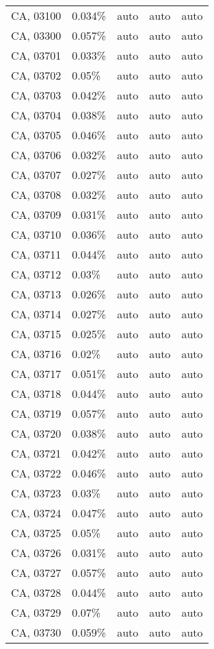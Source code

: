 \begin{longtable}[]{@{}lllll@{}}
CA, 03100 & 0.034\% & auto & auto & auto \\
CA, 03300 & 0.057\% & auto & auto & auto \\
CA, 03701 & 0.033\% & auto & auto & auto \\
CA, 03702 & 0.05\% & auto & auto & auto \\
CA, 03703 & 0.042\% & auto & auto & auto \\
CA, 03704 & 0.038\% & auto & auto & auto \\
CA, 03705 & 0.046\% & auto & auto & auto \\
CA, 03706 & 0.032\% & auto & auto & auto \\
CA, 03707 & 0.027\% & auto & auto & auto \\
CA, 03708 & 0.032\% & auto & auto & auto \\
CA, 03709 & 0.031\% & auto & auto & auto \\
CA, 03710 & 0.036\% & auto & auto & auto \\
CA, 03711 & 0.044\% & auto & auto & auto \\
CA, 03712 & 0.03\% & auto & auto & auto \\
CA, 03713 & 0.026\% & auto & auto & auto \\
CA, 03714 & 0.027\% & auto & auto & auto \\
CA, 03715 & 0.025\% & auto & auto & auto \\
CA, 03716 & 0.02\% & auto & auto & auto \\
CA, 03717 & 0.051\% & auto & auto & auto \\
CA, 03718 & 0.044\% & auto & auto & auto \\
CA, 03719 & 0.057\% & auto & auto & auto \\
CA, 03720 & 0.038\% & auto & auto & auto \\
CA, 03721 & 0.042\% & auto & auto & auto \\
CA, 03722 & 0.046\% & auto & auto & auto \\
CA, 03723 & 0.03\% & auto & auto & auto \\
CA, 03724 & 0.047\% & auto & auto & auto \\
CA, 03725 & 0.05\% & auto & auto & auto \\
CA, 03726 & 0.031\% & auto & auto & auto \\
CA, 03727 & 0.057\% & auto & auto & auto \\
CA, 03728 & 0.044\% & auto & auto & auto \\
CA, 03729 & 0.07\% & auto & auto & auto \\
CA, 03730 & 0.059\% & auto & auto & auto \\

\end{longtable}
